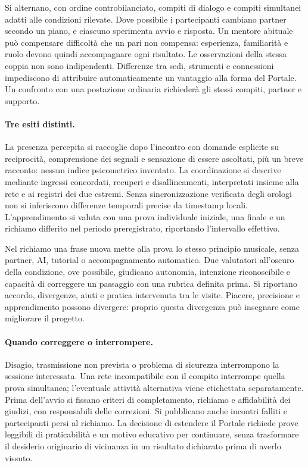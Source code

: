 Si alternano, con ordine controbilanciato, compiti di dialogo e compiti
simultanei adatti alle condizioni rilevate. Dove possibile i partecipanti
cambiano partner secondo un piano, e ciascuno sperimenta avvio e risposta.
Un mentore abituale può compensare difficoltà che un pari non compensa:
esperienza, familiarità e ruolo devono quindi accompagnare ogni risultato.
Le osservazioni della stessa coppia non sono indipendenti. Differenze tra
sedi, strumenti e connessioni impediscono di attribuire automaticamente
un vantaggio alla forma del Portale. Un confronto con una postazione
ordinaria richiederà gli stessi compiti, partner e supporto.

\paragraph{Tre esiti distinti.}
La presenza percepita si raccoglie dopo l'incontro con domande esplicite
su reciprocità, comprensione dei segnali e sensazione di essere ascoltati,
più un breve racconto: nessun indice psicometrico inventato. La coordinazione
si descrive mediante ingressi concordati, recuperi e disallineamenti,
interpretati insieme alla rete e ai registri dei due estremi. Senza
sincronizzazione verificata degli orologi non si inferiscono differenze
temporali precise da timestamp locali. L'apprendimento si valuta con
una prova individuale iniziale, una finale e un richiamo differito nel
periodo preregistrato, riportando l'intervallo effettivo.

Nel richiamo una frase nuova mette alla prova lo stesso principio musicale,
senza partner, AI, tutorial o accompagnamento automatico. Due valutatori
all'oscuro della condizione, ove possibile, giudicano autonomia, intenzione
riconoscibile e capacità di correggere un passaggio con una rubrica definita
prima. Si riportano accordo, divergenze, aiuti e pratica intervenuta tra
le visite. Piacere, precisione e apprendimento possono divergere: proprio
questa divergenza può insegnare come migliorare il progetto.

\paragraph{Quando correggere o interrompere.}
Disagio, trasmissione non prevista o problema di sicurezza interrompono
la sessione interessata. Una rete incompatibile con il compito interrompe
quella prova simultanea; l'eventuale attività alternativa viene etichettata
separatamente. Prima dell'avvio si fissano criteri di completamento,
richiamo e affidabilità dei giudizi, con responsabili delle correzioni.
Si pubblicano anche incontri falliti e partecipanti persi al richiamo.
La decisione di estendere il Portale richiede prove leggibili di praticabilità
e un motivo educativo per continuare, senza trasformare il desiderio
originario di vicinanza in un risultato dichiarato prima di averlo vissuto.
